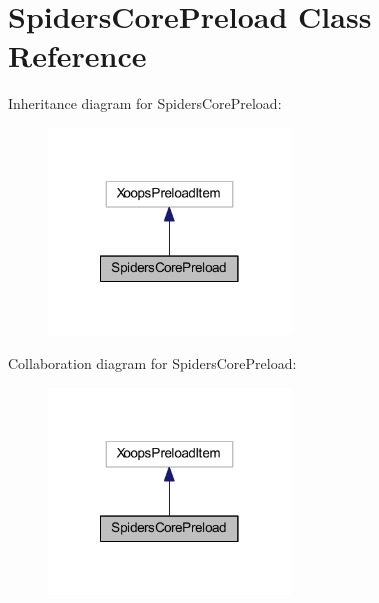 \hypertarget{class_spiders_core_preload}{\section{Spiders\-Core\-Preload Class Reference}
\label{class_spiders_core_preload}
}


Inheritance diagram for Spiders\-Core\-Preload\-:
\nopagebreak
\begin{figure}[H]
\begin{center}
\leavevmode
\includegraphics[width=182pt]{class_spiders_core_preload__inherit__graph}
\end{center}
\end{figure}


Collaboration diagram for Spiders\-Core\-Preload\-:
\nopagebreak
\begin{figure}[H]
\begin{center}
\leavevmode
\includegraphics[width=182pt]{class_spiders_core_preload__coll__graph}
\end{center}
\end{figure}
